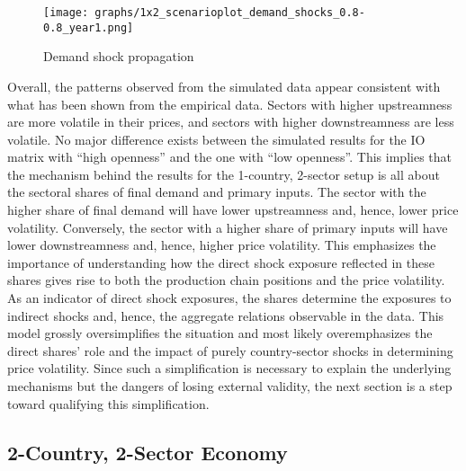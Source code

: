 \begin{figure}[H]
    \texttt{[image: graphs/1x2\_scenarioplot\_demand\_shocks\_0.8-0.8\_year1.png]}
    \caption{\label{fig:1x2demand_y1} Demand shock propagation}
\end{figure}

Overall, the patterns observed from the simulated data appear consistent with what has been shown from the empirical data. Sectors with 
higher upstreamness are more volatile in their prices, and sectors with higher downstreamness are less volatile. No major difference 
exists between the simulated results for the IO matrix with ``high openness'' and the one with ``low openness''. This implies that 
the mechanism behind the results for the 1-country, 2-sector setup is all about the sectoral shares of final demand and primary inputs. 
The sector with the higher share of final demand will have lower upstreamness and, hence, lower price volatility. Conversely, the sector
with a higher share of primary inputs will have lower downstreamness and, hence, higher price volatility. This emphasizes the importance of
understanding how the direct shock exposure reflected in these shares gives rise to both the production chain positions and the
price volatility. As an indicator of direct shock exposures, the shares determine the exposures to indirect shocks and, hence, the 
aggregate relations observable in the data. This model grossly oversimplifies the situation and most likely overemphasizes 
the direct shares' role and the impact of purely country-sector shocks in determining price volatility. Since such a simplification 
is necessary to explain the underlying mechanisms but the dangers of losing external validity, the next section is a step toward 
qualifying this simplification. 


\subsection{2-Country, 2-Sector Economy}

